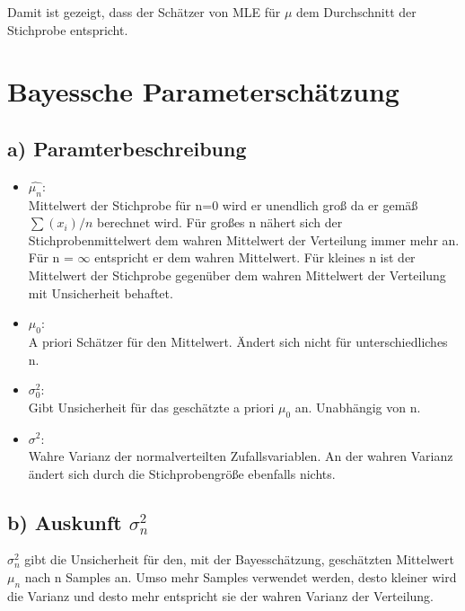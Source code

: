 \documentclass{scrartcl}
\begin{document}
Damit ist gezeigt, dass der Schätzer von MLE für $\mu$ dem Durchschnitt der Stichprobe entspricht.
 

\section{Bayessche Parameterschätzung}
\subsection*{a) Paramterbeschreibung}
\begin{itemize}
	\item $\hat{\mu_n}$:\\
	Mittelwert der Stichprobe für n=0 wird er unendlich groß da er gemäß $\sum(x_i) /n$ berechnet wird. Für großes n nähert sich der Stichprobenmittelwert dem wahren Mittelwert der Verteilung immer mehr an. Für n = $\infty$ entspricht er dem wahren Mittelwert. Für kleines n ist der Mittelwert der Stichprobe gegenüber dem wahren Mittelwert der Verteilung mit Unsicherheit behaftet.
	\item $\mu_0$:\\
	A priori Schätzer für den Mittelwert. Ändert sich nicht für unterschiedliches n. 
	\item $\sigma^2_0$:\\
	Gibt Unsicherheit für das geschätzte a priori $\mu_0$ an. Unabhängig von n.
	\item $\sigma^2$:\\
	Wahre Varianz der normalverteilten Zufallsvariablen. An der wahren Varianz ändert sich durch die Stichprobengröße ebenfalls nichts.
\end{itemize}

\subsection*{b) Auskunft $\sigma^2_n$}
$\sigma^2_n$ gibt die Unsicherheit für den, mit der Bayesschätzung, geschätzten Mittelwert $\mu_n$ nach n Samples an. Umso mehr Samples verwendet werden, desto kleiner wird die Varianz und desto mehr entspricht sie der wahren Varianz der Verteilung.
\end{document}
